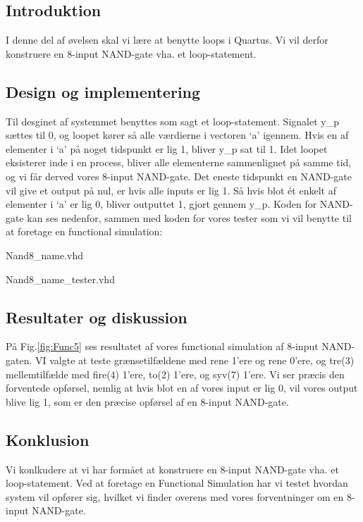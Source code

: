 \documentclass[../journal.tex]{subfiles}
\begin{document}
\subsection{Introduktion}
I denne del af øvelsen skal vi lære at benytte loops i Quartus. Vi vil derfor konstruere en 8-input NAND-gate vha. et loop-statement.

\subsection{Design og implementering}

Til desginet af systemmet benyttes som sagt et loop-statement. Signalet y\_p sættes til 0, og loopet kører så alle værdierne i vectoren `a' igennem. Hvis en af elementer i `a' på noget tidspunkt er lig 1, bliver y\_p sat til 1. Idet loopet eksisterer inde i en process, bliver alle elementerne sammenlignet på samme tid, og vi får derved vores 8-input NAND-gate. Det eneste tidspunkt en NAND-gate vil give et output på nul, er hvis alle inputs er lig 1. Så hvis blot ét enkelt af elementer i `a' er lig 0, bliver outputtet 1, gjort gennem y\_p. Koden for NAND-gate kan ses nedenfor, sammen med koden for vores tester som vi vil benytte til at foretage en functional simulation:

\begin{table}[H]
    \centering
      \framebox{
        \rule{8pt}{0pt}
          
  }
  \caption{Nand8\_name.vhd}	
  \label{src:nand8}
\end{table}

\begin{table}[H]
    \centering
      \framebox{
        \rule{8pt}{0pt}
          
  }
  \caption{Nand8\_name\_tester.vhd}	
  \label{src:nand8_test}
\end{table}

\subsection{Resultater og diskussion}

På Fig.\ref{fig:Func5} ses resultatet af vores functional simulation af 8-input NAND-gaten. VI valgte at teste grænsetilfældene med rene 1'ere og rene 0'ere, og tre(3) mellemtilfælde med fire(4) 1'ere, to(2) 1'ere, og syv(7) 1'ere. Vi ser præcis den forventede opførsel, nemlig at hvis blot en af vores input er lig 0, vil vores output blive lig 1, som er den præcise opførsel af en 8-input NAND-gate.


\subsection{Konklusion}
Vi konlkudere at vi har formået at konstruere en 8-input NAND-gate vha. et loop-statement. Ved at foretage en Functional Simulation har vi testet hvordan system vil opfører sig, hvilket vi finder overens med vores forventninger om en 8-input NAND-gate.
\end{document}
